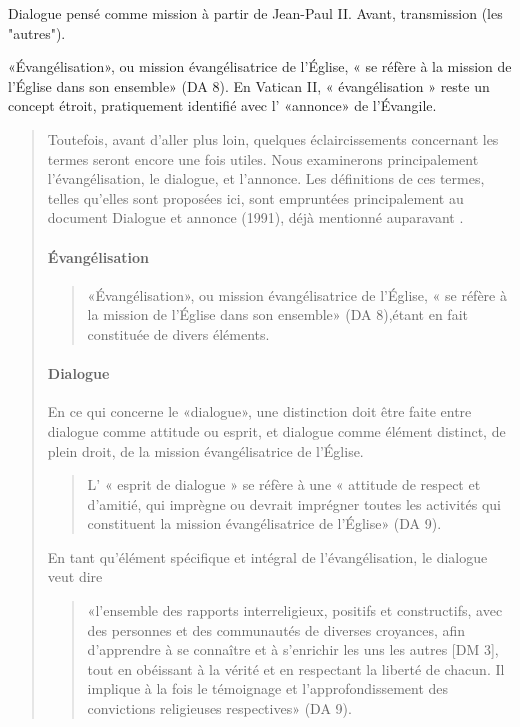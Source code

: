 Dialogue pensé comme mission à partir de Jean-Paul II. Avant, transmission (les "autres").
\begin{Def}[Evangélisation]
«Évangélisation», ou mission évangélisatrice de l'Église, « se réfère à la mission de l'Église dans son ensemble» (DA 8).
En Vatican II, « évangélisation » reste un concept étroit, pratiquement identifié avec
l' «annonce» de l'Évangile.     
\end{Def}
\begin{quote}
Toutefois, avant d'aller plus loin, quelques éclaircissements
concernant les termes seront encore une fois utiles. Nous examinerons
principalement l'évangélisation, le dialogue, et l'annonce.
Les définitions de ces termes, telles qu'elles sont
proposées ici, sont empruntées principalement au document
Dialogue et annonce (1991), déjà mentionné auparavant .
\paragraph{Évangélisation}
\begin{quote}
   «Évangélisation», ou mission évangélisatrice de l'Église, « se réfère à la mission de l'Église dans son ensemble» (DA 8),étant en fait constituée de divers éléments.  
\end{quote}



 

\paragraph{Dialogue}
 
En ce qui concerne
le «dialogue», une distinction doit être faite entre dialogue
comme attitude ou esprit, et dialogue comme élément distinct,
de plein droit, de la mission évangélisatrice de l'Église.
\begin{quote}
    L' « esprit de dialogue » se réfère à une « attitude de respect et
d'amitié, qui imprègne ou devrait imprégner toutes les activités
qui constituent la mission évangélisatrice de l'Église» (DA 9).
\end{quote}    

En tant qu'élément spécifique et intégral de l'évangélisation,
le dialogue veut dire 
\begin{quote}
    «l'ensemble des rapports interreligieux,
positifs et constructifs, avec des personnes et des communautés
de diverses croyances, afin d'apprendre à se connaître et à
s'enrichir les uns les autres [DM 3], tout en obéissant à la
vérité et en respectant la liberté de chacun. Il implique à la fois
le témoignage et l'approfondissement des convictions religieuses
respectives» (DA 9).
\end{quote}


\end{quote}
